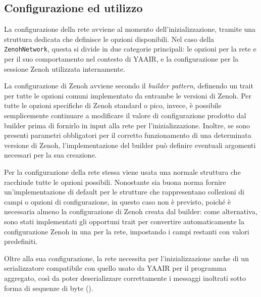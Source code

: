 \subsection{Configurazione ed utilizzo}
\label{sec:configuration-and-usage}

La configurazione della rete avviene al momento dell'inizializzazione, tramite una
struttura dedicata che definisce le opzioni disponibili.
Nel caso della \texttt{ZenohNetwork}, questa si divide in due categorie
principali: le opzioni per la rete e per il suo comportamento nel contesto di
\ac{YAAIR}, e la configurazione per la sessione Zenoh utilizzata internamente.

La configurazione di Zenoh avviene secondo il \emph{builder pattern}, definendo
un trait per tutte le opzioni comuni implementato da entrambe le versioni di Zenoh.
Per tutte le opzioni specifiche di Zenoh standard o pico, invece, è possibile
semplicemente continuare a modificare il valore di configurazione prodotto dal
builder prima di fornirlo in input alla rete per l'inizializzazione. Inoltre, se
sono presenti parametri obbligatori per il corretto funzionamento di una determinata
versione di Zenoh, l'implementazione del builder può definire eventuali argomenti
necessari per la sua creazione.

Per la configurazione della rete stessa viene usata una normale struttura che racchiude
tutte le opzioni possibili.
Nonostante sia buona norma fornire un'implementazione di default per le strutture
che rappresentano collezioni di campi o opzioni di configurazione, in questo caso
non è previsto, poiché è necessaria almeno la configurazione di Zenoh creata dal
builder: come alternativa, sono stati implementati gli opportuni trait per
convertire automaticamente la configurazione Zenoh in una per la rete, impostando
i campi restanti con valori predefiniti.

Oltre alla sua configurazione, la rete necessita per l'inizializzazione anche di
un serializzatore compatibile con quello usato da \ac{YAAIR} per il programma
aggregato, così da poter deserializzare correttamente i messaggi inoltrati sotto
forma di sequenze di byte ().


